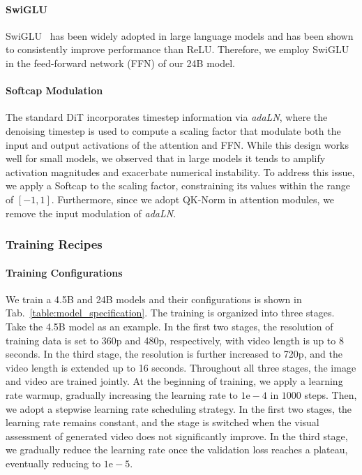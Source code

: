 \paragraph{SwiGLU} SwiGLU~\citep{shazeer2020glu} has been widely adopted in large language models and has been shown to consistently improve performance than ReLU. Therefore, we employ SwiGLU in the feed-forward network (FFN) of our 24B model.

\paragraph{Softcap Modulation} The standard DiT incorporates timestep information via \emph{adaLN}, where the denoising timestep is used to compute a scaling factor that modulate both the input and output activations of the attention and FFN. While this design works well for small models, we observed that in large models it tends to amplify activation magnitudes and exacerbate numerical instability. To address this issue, we apply a Softcap to the scaling factor, constraining its values within the range of $[-1,1]$. Furthermore, since we adopt QK-Norm in attention modules, we remove the input modulation of \emph{adaLN}.


\subsubsection{Training Recipes}
\label{sec:training_recipes}
\paragraph{Training Configurations}
We train a 4.5B and 24B \magi models and their configurations is shown in Tab.~\ref{table:model_specification}. The training is organized into three stages. Take the 4.5B model as an example. In the first two stages, the resolution of training data is set to 360p and 480p, respectively, with video length is up to 8 seconds. In the third stage, the resolution is further increased to 720p, and the video length is extended up to 16 seconds. Throughout all three stages, the image and video are trained jointly. At the beginning of training, we apply a learning rate warmup, gradually increasing the learning rate to $1\mathrm{e-}{4}$ in $1000$ steps. Then, we adopt a stepwise learning rate scheduling strategy. In the first two stages, the learning rate remains constant, and the stage is switched when the visual assessment of generated video does not significantly improve. In the third stage, we gradually reduce the learning rate once the validation loss reaches a plateau, eventually reducing to $1\mathrm{e-}{5}$. 


